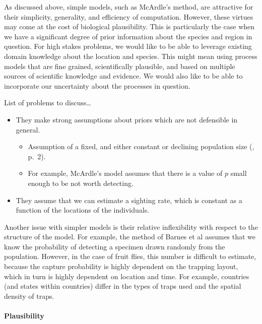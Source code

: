 \documentclass[
]{book}
\providecommand{\tightlist}{%
  \setlength{\itemsep}{0pt}\setlength{\parskip}{0pt}}
\begin{document}
As discussed above, simple models, such as McArdle's method, are attractive for their simplicity, generality, and efficiency of computation. However, these virtues may come at the cost of biological plausibility. This is particularly the case when we have a significant degree of prior information about the species and region in question. For high stakes problems, we would like to be able to leverage existing domain knowledge about the location and species. This might mean using process models that are fine grained, scientifically plausible, and based on multiple sources of scientific knowledge and evidence. We would also like to be able to incorporate our uncertainty about the processes in question.

List of problems to discuss\ldots{}

\begin{itemize}
\tightlist
\item
  They make strong assumptions about priors which are not defensible in general.

  \begin{itemize}
  \tightlist
  \item
    Assumption of a fixed, and either constant or declining population size (\citet{caley2015}, p.~2).
  \item
    For example, McArdle's model assumes that there is a value of \(p\) small enough to be not worth detecting.
  \end{itemize}
\item
  They assume that we can estimate a sighting rate, which is constant as a function of the locations of the individuals.
\end{itemize}

Another issue with simpler models is their relative inflexibility with respect to the structure of the model. For example, the method of Barnes et al assumes that we know the probability of detecting a specimen drawn randomly from the population. However, in the case of fruit flies, this number is difficult to estimate, because the capture probability is highly dependent on the trapping layout, which in turn is highly dependent on location and time. For example, countries (and states within countries) differ in the types of traps used and the spatial density of traps.

\hypertarget{plausibility}{%
\paragraph{Plausibility}\label{plausibility}}
\end{document}
